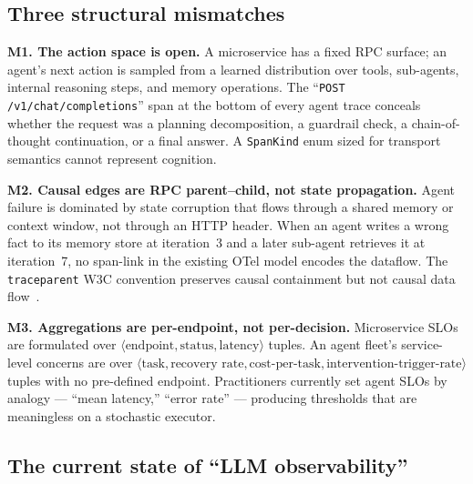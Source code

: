 \documentclass[10pt,conference]{IEEEtran}
\begin{document}
\subsection{Three structural mismatches}

\textbf{M1. The action space is open.}
A microservice has a fixed RPC surface; an agent's next action is
sampled from a learned distribution over tools, sub-agents, internal
reasoning steps, and memory operations. The
``\texttt{POST /v1/chat/completions}'' span at the bottom of every
agent trace conceals whether the request was a planning decomposition,
a guardrail check, a chain-of-thought continuation, or a final answer.
A \texttt{SpanKind} enum sized for transport semantics cannot represent
cognition.

\textbf{M2. Causal edges are RPC parent--child, not state propagation.}
Agent failure is dominated by state corruption that flows through a
shared memory or context window, not through an HTTP header. When an
agent writes a wrong fact to its memory store at iteration~3 and a
later sub-agent retrieves it at iteration~7, no span-link in the
existing OTel model encodes the dataflow. The \texttt{traceparent}
W3C convention preserves causal containment but not causal data
flow~\cite{otel_spec}.

\textbf{M3. Aggregations are per-endpoint, not per-decision.}
Microservice SLOs are formulated over $\langle \text{endpoint},
\text{status}, \text{latency} \rangle$ tuples. An agent fleet's
service-level concerns are over $\langle \text{task}, \text{recovery
rate}, \text{cost-per-task}, \text{intervention-trigger-rate} \rangle$
tuples with no pre-defined endpoint. Practitioners currently set agent
SLOs by analogy --- ``mean latency,'' ``error rate'' --- producing
thresholds that are meaningless on a stochastic executor.

\subsection{The current state of ``LLM observability''}
\end{document}
